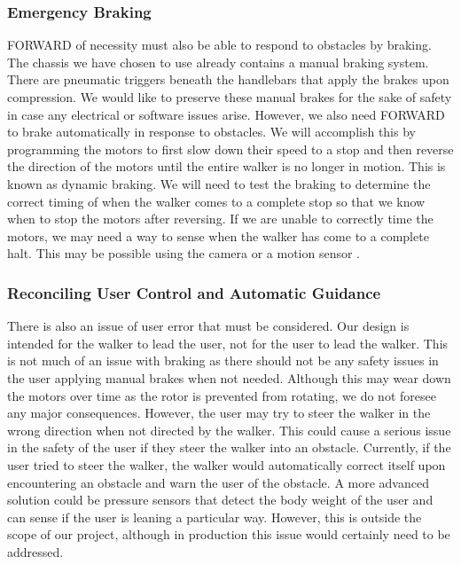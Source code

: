 \subsubsection{Emergency Braking}
\noindent FORWARD of necessity must also be able to respond to obstacles by braking. The chassis we have chosen to use already contains a manual braking system. There are pneumatic triggers beneath the handlebars that apply the brakes upon compression. We would like to preserve these manual brakes for the sake of safety in case any electrical or software issues arise. However, we also need FORWARD to brake automatically in response to obstacles. We will accomplish this by programming the motors to first slow down their speed to a stop and then reverse the direction of the motors until the entire walker is no longer in motion. This is known as dynamic braking\cite{electricaleasy2014}. We will need to test the braking to determine the correct timing of when the walker comes to a complete stop so that we know when to stop the motors after reversing. If we are unable to correctly time the motors, we may need a way to sense when the walker has come to a complete halt. This may be possible using the camera or a motion sensor \cite{bayalarm2024}.\\

\subsubsection{Reconciling User Control and Automatic Guidance}
\noindent There is also an issue of user error that must be considered. Our design is intended for the walker to lead the user, not for the user to lead the walker. This is not much of an issue with braking as there should not be any safety issues in the user applying manual brakes when not needed. Although this may wear down the motors over time as the rotor is prevented from rotating, we do not foresee any major consequences. However, the user may try to steer the walker in the wrong direction when not directed by the walker. This could cause a serious issue in the safety of the user if they steer the walker into an obstacle. Currently, if the user tried to steer the walker, the walker would automatically correct itself upon encountering an obstacle and warn the user of the obstacle. A more advanced solution could be pressure sensors that detect the body weight of the user and can sense if the user is leaning a particular way. However, this is outside the scope of our project, although in production this issue would certainly need to be addressed.\\ 
